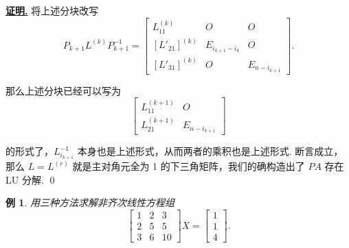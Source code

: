 \documentclass[10pt,openany]{article}
\theoremstyle{thmstyle} %
\theoremstyle{defstyle} %
\theoremstyle{prostyle} %
\theoremstyle{exastyle}
\newtheorem{example}[theorem]{例}
\theoremstyle{remstyle}
\renewenvironment{proof}[1][证明]{\par\underline{\textbf{#1.}} \;\fangsong}{\qed\par}
\begin{document}
\begin{proof}
	将上述分块改写
	\[ P_{k+1}L^{(k)}P_{k+1}^{-1}=\begin{bmatrix}
		L_{11}^{(k)} & O & O \\[1ex]
		[L'_{21}]^{(k)} & E_{i_{k+1}-i_k} & O \\[1ex]
	    [L'_{31}]^{(k)} & O  & E_{n-i_{k+1}}
	\end{bmatrix}. \]
	
	那么上述分块已经可以写为
	\[ \begin{bmatrix}
		L_{11}^{(k+1)} & O \\[1ex]
		L_{21}^{(k+1)} & E_{n-i_{k+1}}
	\end{bmatrix} \]
	
	的形式了，\( L_{i_{k+1}}^{-1} \) 本身也是上述形式，从而两者的乘积也是上述形式. 断言成立，那么 \( L=L^{(r)} \) 就是主对角元全为 1 的下三角矩阵，我们的确构造出了 \( PA \) 存在 LU 分解.
\end{proof}


\begin{example}
	用三种方法求解非齐次线性方程组
	\[ \begin{bmatrix}
		1 & 2 & 3 \\
		2 & 5 & 5 \\
		3 & 6 & 10
	\end{bmatrix}X=\begin{bmatrix}
	   1 \\ 1 \\ 4
	\end{bmatrix}. \]
\end{example}
\end{document}
